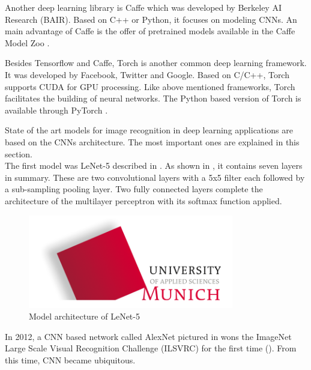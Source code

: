 Another deep learning library is Caffe which was developed by Berkeley AI Research (BAIR). Based on C++ or Python, it focuses on modeling CNNs. An main advantage of Caffe is the offer of pretrained models available in the Caffe Model Zoo \citep{BAIR}. 

Besides Tensorflow and Caffe, Torch is another common deep learning framework. It was developed by Facebook, Twitter and Google. Based on C/C++, Torch supports CUDA for GPU processing. Like above mentioned frameworks, Torch facilitates the building of neural networks. The Python based version of Torch is available through PyTorch \citep{Varangaonkar2017}.
		
State of the art models for image recognition in deep learning applications are based on the CNNs architecture. The most important ones are explained in this section. \\

The first model was LeNet-5 described in \citet{LeCun1998}. As shown in , it contains seven layers in summary. These are two convolutional layers with a 5x5 filter each followed by a sub-sampling pooling layer. Two fully connected layers complete the architecture of the multilayer perceptron with its softmax function applied.\\
	
\begin{figure}[htbp]
\includegraphics[width=0.8\textwidth]{includes/MUASlogo}
\caption[Model architecture of LeNet-5]{Model architecture of LeNet-5 \citep{LeCun1998}}
\label{fig:FH-Logo0}
\end{figure} 

In 2012, a CNN based network called AlexNet pictured in \citet{Krizhevsky2012} wons the ImageNet Large Scale Visual Recognition Challenge (ILSVRC) for the first time (). From this time, CNN became ubiquitous.\\

